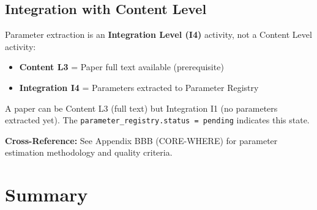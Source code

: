 \subsection{Integration with Content Level}

Parameter extraction is an \textbf{Integration Level (I4)} activity, not a Content Level activity:

\begin{itemize}[nosep]
    \item \textbf{Content L3} = Paper full text available (prerequisite)
    \item \textbf{Integration I4} = Parameters extracted to Parameter Registry
\end{itemize}

A paper can be Content L3 (full text) but Integration I1 (no parameters extracted yet).
The \texttt{parameter\_registry.status = pending} indicates this state.

\textbf{Cross-Reference:} See Appendix BBB (CORE-WHERE) for parameter estimation
methodology and quality criteria.


\section{Summary}
\label{sec:paperint-summary}

